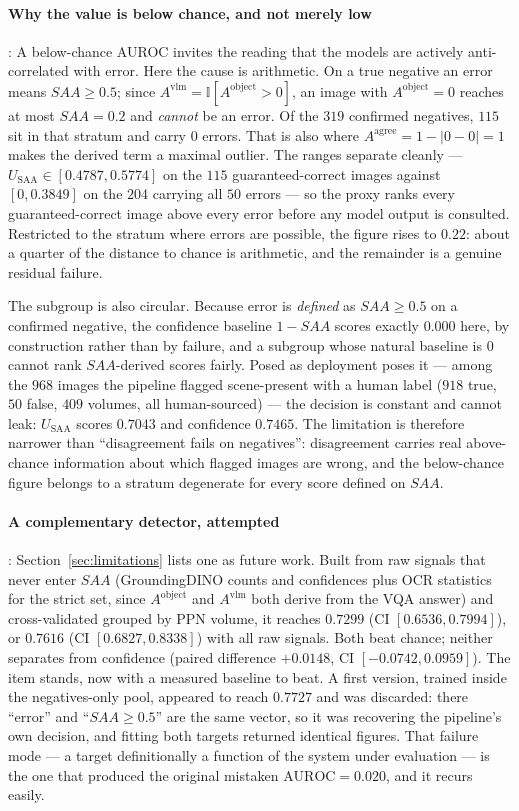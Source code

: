 \documentclass[12pt,a4paper]{report}
\begin{document}
\paragraph{Why the value is below chance, and not merely low}: A below-chance AUROC invites the reading that the models are actively anti-correlated with error. Here the cause is arithmetic. On a true negative an error means $SAA \ge 0.5$; since $A^{\text{vlm}} = \mathbb{I}[A^{\text{object}}>0]$, an image with $A^{\text{object}}=0$ reaches at most $SAA=0.2$ and \emph{cannot} be an error. Of the $319$ confirmed negatives, $115$ sit in that stratum and carry $0$ errors. That is also where $A^{\text{agree}} = 1-|0-0| = 1$ makes the derived term a maximal outlier. The ranges separate cleanly --- $U_{\text{SAA}} \in [0.4787, 0.5774]$ on the $115$ guaranteed-correct images against $[0, 0.3849]$ on the $204$ carrying all $50$ errors --- so the proxy ranks every guaranteed-correct image above every error before any model output is consulted. Restricted to the stratum where errors are possible, the figure rises to $0.22$: about a quarter of the distance to chance is arithmetic, and the remainder is a genuine residual failure.

The subgroup is also circular. Because error is \emph{defined} as $SAA\ge0.5$ on a confirmed negative, the confidence baseline $1-SAA$ scores exactly $0.000$ here, by construction rather than by failure, and a subgroup whose natural baseline is $0$ cannot rank $SAA$-derived scores fairly. Posed as deployment poses it --- among the $968$ images the pipeline flagged scene-present with a human label ($918$ true, $50$ false, $409$ volumes, all human-sourced) --- the decision is constant and cannot leak: $U_{\text{SAA}}$ scores $0.7043$ and confidence $0.7465$. The limitation is therefore narrower than ``disagreement fails on negatives'': disagreement carries real above-chance information about which flagged images are wrong, and the below-chance figure belongs to a stratum degenerate for every score defined on $SAA$.

\paragraph{A complementary detector, attempted}: Section~\ref{sec:limitations} lists one as future work. Built from raw signals that never enter $SAA$ (GroundingDINO counts and confidences plus OCR statistics for the strict set, since $A^{\text{object}}$ and $A^{\text{vlm}}$ both derive from the VQA answer) and cross-validated grouped by PPN volume, it reaches $0.7299$ (CI $[0.6536, 0.7994]$), or $0.7616$ (CI $[0.6827, 0.8338]$) with all raw signals. Both beat chance; neither separates from confidence (paired difference $+0.0148$, CI $[-0.0742, 0.0959]$). The item stands, now with a measured baseline to beat. A first version, trained inside the negatives-only pool, appeared to reach $0.7727$ and was discarded: there ``error'' and ``$SAA\ge0.5$'' are the same vector, so it was recovering the pipeline's own decision, and fitting both targets returned identical figures. That failure mode --- a target definitionally a function of the system under evaluation --- is the one that produced the original mistaken $\text{AUROC}=0.020$, and it recurs easily.
\end{document}
